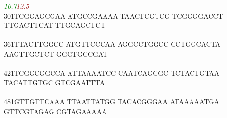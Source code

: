 \documentclass[11pt,twoside,reqno,a4paper]{article}
\begin{document}
{\hspace*{4\charwidth}\hspace*{2\charwidth}\textit{\textcolor{Green}{10.7}}\hspace*{1\charwidth}\hspace*{1\charwidth}\hspace*{1\charwidth}\hspace*{26\charwidth}\textit{\textcolor{Brown}{12.5}}\hspace*{1\charwidth}\hspace*{1\charwidth}\hspace*{1\charwidth}\\
301\hspace*{1\charwidth}TCGGAGCGAA	ATGCCGAAAA	TAACTCGTCG	TCGGGGACCT	TTGACTTCAT	TTGCAGCTCT	\\
\hspace*{4\charwidth}\hspace*{1\charwidth}\hspace*{1\charwidth}\hspace*{1\charwidth}\hspace*{1\charwidth}\hspace*{1\charwidth}\hspace*{1\charwidth}\\
361\hspace*{1\charwidth}TTACTTGGCC	ATGTTCCCAA	AGGCCTGGCC	CCTGGCACTA	AAGTTGCTCT	GGGTGGCGAT	\\
\hspace*{4\charwidth}\hspace*{1\charwidth}\hspace*{1\charwidth}\hspace*{1\charwidth}\hspace*{1\charwidth}\hspace*{1\charwidth}\hspace*{1\charwidth}\\
421\hspace*{1\charwidth}TCGGCGGCCA	ATTAAAATCC	CAATCAGGGC	TCTACTGTAA	TACATTGTGC	GTCGAATTTA	\\
\hspace*{4\charwidth}\hspace*{1\charwidth}\hspace*{1\charwidth}\hspace*{1\charwidth}\hspace*{1\charwidth}\hspace*{1\charwidth}\hspace*{1\charwidth}\\
481\hspace*{1\charwidth}GTTGTTCAAA	TTAATTATGG	TACACGGGAA	ATAAAAATGA	GTTCGTAGAG	CGTAGAAAAA	\\
\hspace*{4\charwidth}\hspace*{1\charwidth}\hspace*{1\charwidth}\hspace*{1\charwidth}\hspace*{1\charwidth}\hspace*{1\charwidth}\hspace*{1\charwidth}\\
}
\end{document}
